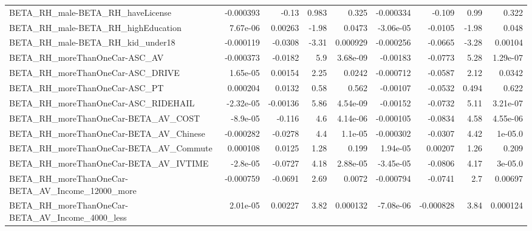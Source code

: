 \begin{tabular}{lrrrrrrrr}
BETA\_RH\_male-BETA\_RH\_haveLicense                   &   -0.000393 &        -0.13 &    0.983 &    0.325 &  -0.000334 &      -0.109 &         0.99 &         0.322 \\
BETA\_RH\_male-BETA\_RH\_highEducation                 &    7.67e-06 &      0.00263 &    -1.98 &   0.0473 &  -3.06e-05 &     -0.0105 &        -1.98 &         0.048 \\
BETA\_RH\_male-BETA\_RH\_kid\_under18                   &   -0.000119 &      -0.0308 &    -3.31 & 0.000929 &  -0.000256 &     -0.0665 &        -3.28 &       0.00104 \\
BETA\_RH\_moreThanOneCar-ASC\_AV                      &   -0.000373 &      -0.0182 &      5.9 & 3.68e-09 &   -0.00183 &     -0.0773 &         5.28 &      1.29e-07 \\
BETA\_RH\_moreThanOneCar-ASC\_DRIVE                   &    1.65e-05 &      0.00154 &     2.25 &   0.0242 &  -0.000712 &     -0.0587 &         2.12 &        0.0342 \\
BETA\_RH\_moreThanOneCar-ASC\_PT                      &    0.000204 &       0.0132 &     0.58 &    0.562 &   -0.00107 &     -0.0532 &        0.494 &         0.622 \\
BETA\_RH\_moreThanOneCar-ASC\_RIDEHAIL                &   -2.32e-05 &     -0.00136 &     5.86 & 4.54e-09 &   -0.00152 &     -0.0732 &         5.11 &      3.21e-07 \\
BETA\_RH\_moreThanOneCar-BETA\_AV\_COST                &    -8.9e-05 &       -0.116 &      4.6 & 4.14e-06 &  -0.000105 &     -0.0834 &         4.58 &      4.55e-06 \\
BETA\_RH\_moreThanOneCar-BETA\_AV\_Chinese             &   -0.000282 &      -0.0278 &      4.4 &  1.1e-05 &  -0.000302 &     -0.0307 &         4.42 &       1e-05.0 \\
BETA\_RH\_moreThanOneCar-BETA\_AV\_Commute             &    0.000108 &       0.0125 &     1.28 &    0.199 &   1.94e-05 &     0.00207 &         1.26 &         0.209 \\
BETA\_RH\_moreThanOneCar-BETA\_AV\_IVTIME              &    -2.8e-05 &      -0.0727 &     4.18 & 2.88e-05 &  -3.45e-05 &     -0.0806 &         4.17 &       3e-05.0 \\
BETA\_RH\_moreThanOneCar-BETA\_AV\_Income\_12000\_more   &   -0.000759 &      -0.0691 &     2.69 &   0.0072 &  -0.000794 &     -0.0741 &          2.7 &       0.00697 \\
BETA\_RH\_moreThanOneCar-BETA\_AV\_Income\_4000\_less    &    2.01e-05 &      0.00227 &     3.82 & 0.000132 &  -7.08e-06 &   -0.000828 &         3.84 &      0.000124 \\

\end{tabular}
